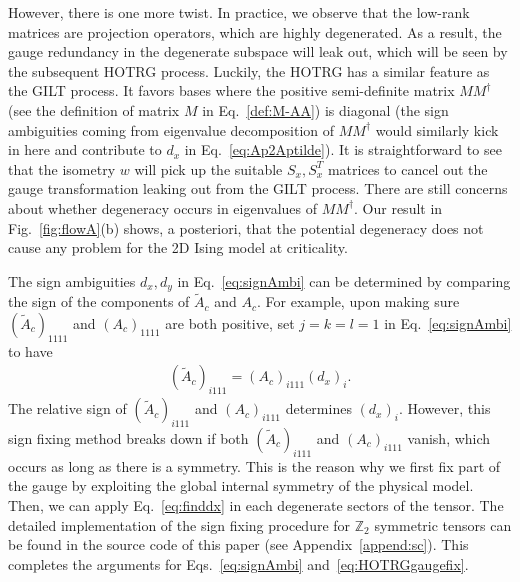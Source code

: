 \documentclass[aps,prr,reprint,superscriptaddress,floatfix]{revtex4-2}
\begin{document}
However, there is one more twist. In practice, we observe that the low-rank matrices are projection operators, which are highly degenerated. 
As a result, the gauge redundancy in the degenerate subspace will leak out, which will be seen by the subsequent HOTRG process. 
Luckily, the HOTRG has a similar feature as the GILT process.
It favors bases where the positive semi-definite matrix $M M^{\dagger}$ (see the definition of matrix $M$ in Eq.~\eqref{def:M-AA}) is diagonal (the sign ambiguities coming from eigenvalue decomposition of $M M^{\dagger}$ would similarly kick in here and contribute to $d_x$ in Eq.~\eqref{eq:Ap2Aptilde}). 
It is straightforward to see that the isometry $w$ will pick up the suitable $S_x,S_x^T$ matrices to cancel out the gauge transformation leaking out from the GILT process.
There are still concerns about whether degeneracy occurs in eigenvalues of $M M^{\dagger}$. 
Our result in Fig.~\ref{fig:flowA}(b) shows, a posteriori, that the potential degeneracy does not cause any problem for the 2D Ising model at criticality.
%

The sign ambiguities $d_x,d_y$ in Eq.~\eqref{eq:signAmbi} can be determined by comparing the sign of the components of $\tilde{A}_c$ and $A_c$.
For example, upon making sure $(\tilde{A}_c)_{1111}$ and $(A_c)_{1111}$ are both positive, set $j = k = l = 1$ in Eq.~\eqref{eq:signAmbi} to have
%
\begin{align}\label{eq:finddx}
    (\tilde{A}_c)_{i111} =
    (A_c)_{i111}(d_x)_i. 
\end{align}
%
The relative sign of $(\tilde{A}_c)_{i111}$ and $(A_c)_{i111}$ determines $(d_x)_i$.
However, this sign fixing method breaks down if both $(\tilde{A}_c)_{i111}$ and $(A_c)_{i111}$ vanish, which occurs as long as there is a symmetry.
This is the reason why we first fix part of the gauge by exploiting the global internal symmetry of the physical model.
Then, we can apply Eq.~\eqref{eq:finddx} in each degenerate sectors of the tensor.
The detailed implementation of the sign fixing procedure for $\mathbb{Z}_2$ symmetric tensors can be found in the source code of this paper (see Appendix~\ref{append:sc}).
This completes the arguments for Eqs.~\eqref{eq:signAmbi} and~\eqref{eq:HOTRGgaugefix}.
%
\end{document}
